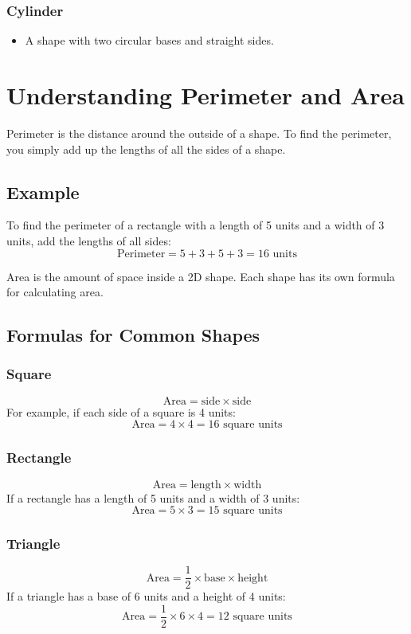 \subsubsection{Cylinder}
\begin{itemize}
    \item A shape with two circular bases and straight sides.
\end{itemize}

\section{Understanding Perimeter and Area}
Perimeter is the distance around the outside of a shape. To find the perimeter, you simply add up the lengths of all the sides of a shape.

\subsection{Example}
To find the perimeter of a rectangle with a length of 5 units and a width of 3 units, add the lengths of all sides:
\[
\text{Perimeter} = 5 + 3 + 5 + 3 = 16 \text{ units}
\]

Area is the amount of space inside a 2D shape. Each shape has its own formula for calculating area.

\subsection{Formulas for Common Shapes}
\subsubsection{Square}
\[
\text{Area} = \text{side} \times \text{side}
\]
For example, if each side of a square is 4 units:
\[
\text{Area} = 4 \times 4 = 16 \text{ square units}
\]

\subsubsection{Rectangle}
\[
\text{Area} = \text{length} \times \text{width}
\]
If a rectangle has a length of 5 units and a width of 3 units:
\[
\text{Area} = 5 \times 3 = 15 \text{ square units}
\]

\subsubsection{Triangle}
\[
\text{Area} = \frac{1}{2} \times \text{base} \times \text{height}
\]
If a triangle has a base of 6 units and a height of 4 units:
\[
\text{Area} = \frac{1}{2} \times 6 \times 4 = 12 \text{ square units}
\]

